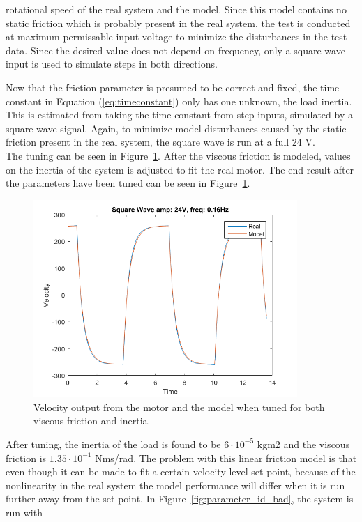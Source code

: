 \documentclass[12pt,a4paper]{article}
\begin{document}
rotational speed of the real system and the model. Since this model contains no
static friction which is probably present in the real system, the test is
conducted at maximum permissable input voltage to minimize the disturbances in
the test data. Since the desired value does not depend on frequency, only a
square wave input is used to simulate steps in both directions. \par
Now that the friction parameter is presumed to be correct and fixed, the time
constant in Equation (\ref{eq:timeconstant}) only has one unknown, the load
inertia. This is estimated from taking the time constant from step inputs,
simulated by a square wave signal. Again, to minimize model disturbances caused
by the static friction present in the real system, the square wave is run at a
full 24 V.\\
The tuning can be seen in Figure~\ref{fig:l1_sq_a24_f016}. After the viscous
friction is modeled, values on the inertia of the system is adjusted to fit the
real motor. The end result after the parameters have been tuned can be seen in
Figure~\ref{fig:l1_sq_a24_f016}.
\begin{figure}[H]
    \centering
    \includegraphics[width=100mm]{l1_sq_a24_f016.png}
    \caption{Velocity output from the motor and the model when tuned for
    both viscous friction and inertia.}
    \label{fig:l1_sq_a24_f016}
\end{figure}
After tuning, the inertia of the load is found to be $6\cdot10^{-5}$ kgm2
and the viscous friction is $1.35\cdot10^{-1}$ Nms/rad. The problem with this linear
friction model is that even though it can be made to fit a certain velocity
level set point, because of the nonlinearity in the real system the model
performance will differ when it is run further away
from the set point. In Figure~\ref{fig:parameter_id_bad}, the system is run with
\end{document}
